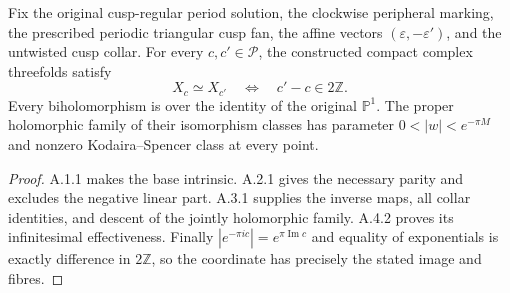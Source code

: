 \begin{theorem}[A.5.1; Proved]\label{st:A.5.1}
Fix the original cusp-regular period solution, the clockwise peripheral marking, the prescribed periodic triangular cusp fan, the affine vectors $(\varepsilon,-\varepsilon')$, and the untwisted cusp collar. For every $c,c'\in\mathcal P$, the constructed compact complex threefolds satisfy
\[
 X_c\simeq X_{c'}\quad\Longleftrightarrow\quad c'-c\in2\mathbb Z.
\]
Every biholomorphism is over the identity of the original $\mathbb P^1$. The proper holomorphic family of their isomorphism classes has parameter $0<|w|<e^{-\pi M}$ and nonzero Kodaira--Spencer class at every point.
\end{theorem}
\begin{proof}
A.1.1 makes the base intrinsic. A.2.1 gives the necessary parity and excludes the negative linear part. A.3.1 supplies the inverse maps, all collar identities, and descent of the jointly holomorphic family. A.4.2 proves its infinitesimal effectiveness. Finally $|e^{-\pi ic}|=e^{\pi\operatorname{Im}c}$ and equality of exponentials is exactly difference in $2\mathbb Z$, so the coordinate has precisely the stated image and fibres.
\end{proof}

